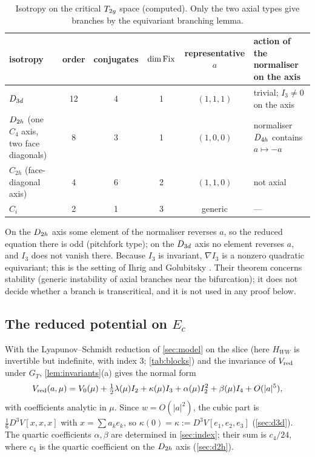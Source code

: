 \begin{table}[h]
\centering\small
\caption{Isotropy on the critical $T_{2g}$ space (computed). Only the two axial types give branches by the
equivariant branching lemma.}\label{tab:isotropy}
\begin{tabularx}{\textwidth}{>{\raggedright\arraybackslash}p{3.3cm}cccc>{\raggedright\arraybackslash}X}
\toprule
isotropy & order & conjugates & $\dim\operatorname{Fix}$ & representative $a$ & action of the normaliser on the axis\\
\midrule
$D_{3d}$ & 12 & 4 & 1 & $(1,1,1)$ & trivial; $I_3\ne0$ on the axis\\
$D_{2h}$ (one $C_4$ axis, two face diagonals) & 8 & 3 & 1 & $(1,0,0)$ & normaliser $D_{4h}$ contains $a\mapsto-a$\\
$C_{2h}$ (face-diagonal axis) & 4 & 6 & 2 & $(1,1,0)$ & not axial\\
$C_i$ & 2 & 1 & 3 & generic & ---\\
\bottomrule
\end{tabularx}
\end{table}

On the $D_{2h}$ axis some element of the normaliser reverses $a$, so the reduced equation there is odd (pitchfork
type); on the $D_{3d}$ axis no element reverses $a$, and $I_3$ does not vanish there. Because $I_3$ is invariant,
$\nabla I_3$ is a nonzero quadratic equivariant; this is the setting of Ihrig and Golubitsky \citep{IhrigGolubitsky1984}.
Their theorem concerns stability (generic instability of axial branches near the bifurcation); it does not decide
whether a branch is transcritical, and it is not used in any proof below.

\subsection{The reduced potential on $E_c$}

With the Lyapunov--Schmidt reduction of \cref{sec:model} on the slice (here $H_{WW}$ is invertible but indefinite, with
index $3$; \cref{tab:blocks}) and the invariance of $V_{\mathrm{red}}$ under $G_T$, \cref{lem:invariants}(a) gives the normal form
\begin{equation}\label{eq:normalform}
V_{\mathrm{red}}(a,\mu)=V_0(\mu)+\tfrac12\lambda(\mu)I_2+\kappa(\mu)I_3+\alpha(\mu)I_2^2+\beta(\mu)I_4+O(|a|^5),
\end{equation}
with coefficients analytic in $\mu$. Since $w=O(|a|^2)$, the cubic part is $\frac16D^3V[x,x,x]$ with $x=\sum a_ke_k$, so
$\kappa(0)=\kappa:=D^3V[e_1,e_2,e_3]$ (\cref{sec:d3d}). The quartic coefficients $\alpha,\beta$ are determined in
\cref{sec:index}; their sum is $c_4/24$, where $c_4$ is the quartic coefficient on the $D_{2h}$ axis (\cref{sec:d2h}).

